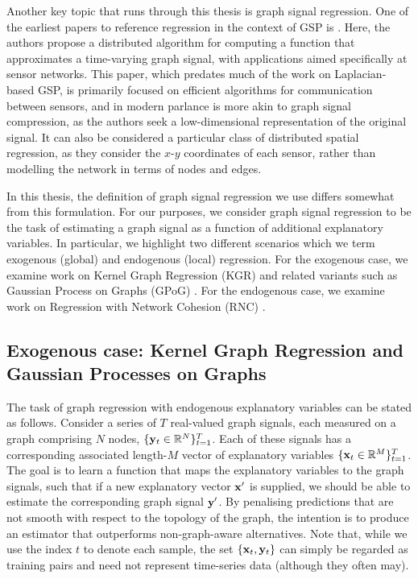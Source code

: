 Another key topic that runs through this thesis is graph signal regression. One of the earliest papers to reference regression in the context of GSP is \cite{Guestrin2004}. Here, the authors propose a distributed algorithm for computing a function that approximates a time-varying graph signal, with applications aimed specifically at sensor networks. This paper, which predates much of the work on Laplacian-based GSP, is primarily focused on efficient algorithms for communication between sensors, and in modern parlance is more akin to graph signal compression, as the authors seek a low-dimensional representation of the original signal. It can also be considered a particular class of distributed spatial regression, as they consider the $x$-$y$ coordinates of each sensor, rather than modelling the network in terms of nodes and edges. 

In this thesis, the definition of graph signal regression we use differs somewhat from this formulation. For our purposes, we consider graph signal regression to be the task of estimating a graph signal as a function of additional explanatory variables. In particular, we highlight two different scenarios which we term exogenous (global) and endogenous (local) regression. For the exogenous case, we examine work on Kernel Graph Regression (KGR) \citep{Venkitaraman2019} and related variants such as Gaussian Process on Graphs (GPoG) \cite{Venkitaraman2020}. For the endogenous case, we examine work on Regression with Network Cohesion (RNC) \citep{Li2019}. 


\subsection{Exogenous case: Kernel Graph Regression and Gaussian Processes on Graphs}

The task of graph regression with endogenous explanatory variables can be stated as follows. Consider a series of $T$ real-valued graph signals, each measured on a graph comprising $N$ nodes, $\{\mathbf{y}_t \in \mathbb{R}^N\}_{t=1}^T$. Each of these signals has a corresponding associated length-$M$ vector of explanatory variables $\{\mathbf{x}_t \in \mathbb{R}^M\}_{t=1}^T$. The goal is to learn a function that maps the explanatory variables to the graph signals, such that if a new explanatory vector $\mathbf{x}'$ is supplied, we should be able to estimate the corresponding graph signal $\mathbf{y}'$. By penalising predictions that are not smooth with respect to the topology of the graph, the intention is to produce an estimator that outperforms non-graph-aware alternatives. Note that, while we use the index $t$ to denote each sample, the set $\{\mathbf{x}_t, \mathbf{y}_t\}$ can simply be regarded as training pairs and need not represent time-series data (although they often may). 


